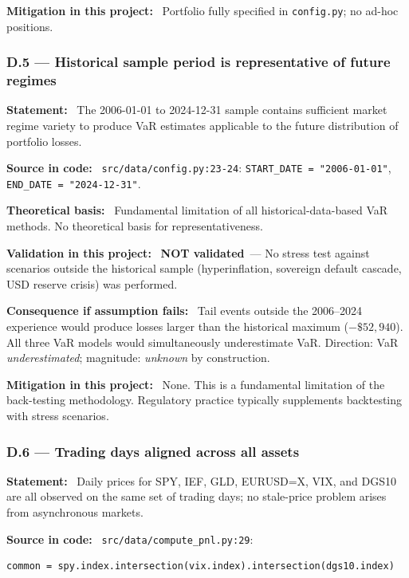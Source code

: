 \documentclass[11pt,a4paper]{article}
\newcommand{\asmfield}[1]{\medskip\noindent\textbf{#1:}\ }
\newcommand{\code}[1]{\texttt{#1}}
\newcommand{\notvalidated}{\textbf{NOT validated}}
\begin{document}
\asmfield{Mitigation in this project}
Portfolio fully specified in \code{config.py}; no ad-hoc positions.

\subsubsection{D.5 --- Historical sample period is representative of future regimes}\label{asm:D5}

\asmfield{Statement}
The 2006-01-01 to 2024-12-31 sample contains sufficient market regime
variety to produce VaR estimates applicable to the future distribution of
portfolio losses.

\asmfield{Source in code}
\code{src/data/config.py:23-24}: \lstinline|START_DATE = "2006-01-01"|,
\lstinline|END_DATE = "2024-12-31"|.

\asmfield{Theoretical basis}
Fundamental limitation of all historical-data-based VaR methods. No
theoretical basis for representativeness.

\asmfield{Validation in this project}
\notvalidated\ --- No stress test against scenarios outside the historical
sample (hyperinflation, sovereign default cascade, USD reserve crisis)
was performed.

\asmfield{Consequence if assumption fails}
Tail events outside the 2006--2024 experience would produce losses larger
than the historical maximum ($-\$52{,}940$). All three VaR models would
simultaneously underestimate VaR. Direction: VaR \emph{underestimated};
magnitude: \emph{unknown} by construction.

\asmfield{Mitigation in this project}
None. This is a fundamental limitation of the back-testing methodology.
Regulatory practice typically supplements backtesting with stress scenarios.

\subsubsection{D.6 --- Trading days aligned across all assets}\label{asm:D6}

\asmfield{Statement}
Daily prices for SPY, IEF, GLD, EURUSD=X, VIX, and DGS10 are all
observed on the same set of trading days; no stale-price problem arises
from asynchronous markets.

\asmfield{Source in code}
\code{src/data/compute\_pnl.py:29}:
\begin{lstlisting}
common = spy.index.intersection(vix.index).intersection(dgs10.index)
\end{lstlisting}
\end{document}

